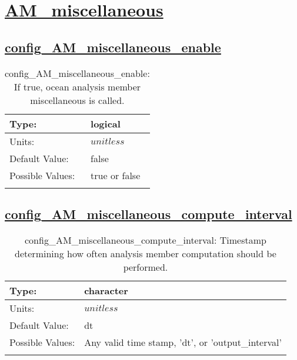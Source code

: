 \section[AM\_miscellaneous]{\hyperref[sec:nm_tab_AM_miscellaneous]{AM\_miscellaneous}}
\label{sec:nm_sec_AM_miscellaneous}
\subsection[config\_AM\_miscellaneous\_enable]{\hyperref[sec:nm_tab_AM_miscellaneous]{config\_AM\_miscellaneous\_enable}}
\label{subsec:nm_sec_config_AM_miscellaneous_enable}
\begin{center}
\begin{longtable}{| p{2.0in} || p{4.0in} |}
    \hline
    Type: & logical \\
    \hline
    Units: & $unitless$ \\
    \hline
    Default Value: & false \\
    \hline
    Possible Values: & true or false \\
    \hline
    \caption{config\_AM\_miscellaneous\_enable: If true, ocean analysis member miscellaneous is called.}
\end{longtable}
\end{center}
\subsection[config\_AM\_miscellaneous\_compute\_interval]{\hyperref[sec:nm_tab_AM_miscellaneous]{config\_AM\_miscellaneous\_compute\_interval}}
\label{subsec:nm_sec_config_AM_miscellaneous_compute_interval}
\begin{center}
\begin{longtable}{| p{2.0in} || p{4.0in} |}
    \hline
    Type: & character \\
    \hline
    Units: & $unitless$ \\
    \hline
    Default Value: & dt \\
    \hline
    Possible Values: & Any valid time stamp, 'dt', or 'output\_interval' \\
    \hline
    \caption{config\_AM\_miscellaneous\_compute\_interval: Timestamp determining how often analysis member computation should be performed.}
\end{longtable}
\end{center}
